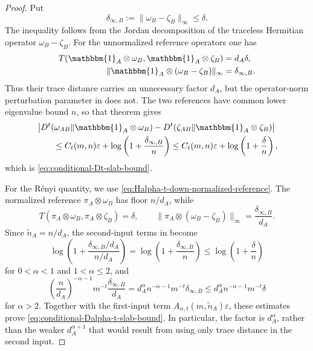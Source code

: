 \documentclass[11pt]{article}
\theoremstyle{remark}
\newcommand{\1}{\mathbbm{1}}
\begin{document}
\begin{proof}
Put
\begin{equation*}
 \delta_{\infty,B}:=\lVert\omega_B-\zeta_B\rVert_\infty\leq\delta.
\end{equation*}
The inequality follows from the Jordan decomposition of the
traceless Hermitian operator $\omega_B-\zeta_B$.  For the
unnormalized reference operators one has
\begin{equation*}
 \begin{aligned}
 T(\1_A\otimes\omega_B,\1_A\otimes\zeta_B)
 &=d_A\delta,\\
 \lVert\1_A\otimes(\omega_B-\zeta_B)\rVert_\infty
 &=\delta_{\infty,B}.
 \end{aligned}
\end{equation*}
Thus their trace distance carries an unnecessary factor $d_A$, but
the operator-norm perturbation parameter in
 does not.  The two references
have common lower eigenvalue bound $n$, so that theorem gives
\begin{equation*}
 \begin{aligned}
 &\left|D^t(\omega_{AB}\Vert\1_A\otimes\omega_B)
       -D^t(\zeta_{AB}\Vert\1_A\otimes\zeta_B)\right|\\
 &\qquad\leq C_t(m,n)\varepsilon
       +\log\left(1+\frac{\delta_{\infty,B}}{n}\right)
 \leq C_t(m,n)\varepsilon
       +\log\left(1+\frac{\delta}{n}\right),
 \end{aligned}
\end{equation*}
which is \eqref{eq:conditional-Dt-slab-bound}.

For the R\'enyi quantity, we use
\eqref{eq:Halpha-t-down-normalized-reference}.  The normalized
reference $\pi_A\otimes\omega_B$ has floor $n/d_A$, while
\begin{equation}
 T(\pi_A\otimes\omega_B,\pi_A\otimes\zeta_B)=\delta,
 \qquad
 \lVert\pi_A\otimes(\omega_B-\zeta_B)\rVert_\infty
 =\frac{\delta_{\infty,B}}{d_A}.
\end{equation}
Since $\widetilde n_A=n/d_A$, the second-input terms in
 become
\begin{equation*}
 \log\left(1+\frac{\delta_{\infty,B}/d_A}{n/d_A}\right)
 =\log\left(1+\frac{\delta_{\infty,B}}{n}\right)
 \leq\log\left(1+\frac{\delta}{n}\right)
\end{equation*}
for $0<\alpha<1$ and $1<\alpha\leq2$, and
\begin{equation*}
 \left(\frac{n}{d_A}\right)^{-\alpha-1}
 m^{-t}\frac{\delta_{\infty,B}}{d_A}
 =d_A^\alpha n^{-\alpha-1}m^{-t}\delta_{\infty,B}
 \leq d_A^\alpha n^{-\alpha-1}m^{-t}\delta
\end{equation*}
for $\alpha>2$.  Together with the first-input term
$A_{\alpha,t}(m,\widetilde n_A)\varepsilon$, these estimates prove
\eqref{eq:conditional-Dalpha-t-slab-bound}.  In particular, the
factor is $d_A^\alpha$, rather than the weaker $d_A^{\alpha+1}$ that
would result from using only trace distance in the second input.
\end{proof}
\end{document}
